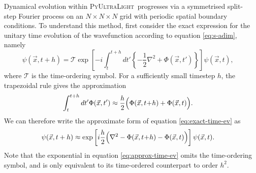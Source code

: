 \documentclass[a4paper,11pt]{article}
\newcommand{\PyUltraLight}{\textsc{PyUltraLight}\xspace}
\begin{document}
Dynamical evolution within \PyUltraLight\ progresses via a symmetrised split-step Fourier process on an $N\times N\times N$  grid with  periodic spatial boundary conditions. To understand this method,  first consider the exact expression for the unitary time evolution of the wavefunction according to equation \ref{eq:s-adim}, namely
\begin{equation}\label{eq:exact-time-ev}
    \psi(\vec{x},t+h)=\mathcal{T}\operatorname{exp}\left[-i\int_t^{t+h}dt'\left\{-\frac{1}{2}\nabla^2+\Phi(\vec{x},t')\right\}\right]\psi(\vec{x},t),
\end{equation}
where $\mathcal{T}$ is the time-ordering symbol. For a sufficiently small timestep $h$,  the trapezoidal rule gives the approximation
\begin{equation}
    \int_t^{t+h}dt'\Phi(\vec{x},t')\approx \frac{h}{2}\Big(\Phi(\vec{x},t\hspace*{-.2em}+\hspace*{-.2em}h)+\Phi(\vec{x},t)\Big).
\end{equation}
We can therefore write the approximate form of equation \ref{eq:exact-time-ev} as
\begin{equation}\label{eq:approx-time-ev}
    \psi(\vec{x},t+h)\approx \operatorname{exp}\left[i\frac{h}{2}\Big(\nabla^2-\Phi(\vec{x},t\hspace*{-.2em}+\hspace*{-.2em}h)-\Phi(\vec{x},t)\Big)\right]\psi(\vec{x},t).
\end{equation}
Note that the exponential in equation \ref{eq:approx-time-ev} omits the time-ordering symbol, and is only equivalent to its time-ordered counterpart to order $h^2$. 
\end{document}

